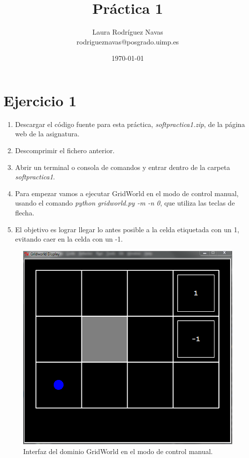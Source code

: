 \documentclass[11pt]{exam}
\title{Práctica 1}
\author{Laura Rodríguez Navas \\ rodrigueznavas@posgrado.uimp.es}
\date{{\selectlanguage{spanish}\today} }
\begin{document}
	
\maketitle

\section*{Ejercicio 1}

\begin{enumerate}
	\item Descargar el código fuente para esta práctica, \textit{softpractica1.zip}, de la página web de la asignatura.
	\item Descomprimir el fichero anterior.
	\item Abrir un terminal o consola de comandos y entrar dentro de la carpeta \textit{softpractica1}.
	\item Para empezar vamos a ejecutar GridWorld en el modo de control manual, usando el comando \textit{python gridworld.py -m -n 0}, que utiliza las teclas de flecha.	
	\item El objetivo es lograr llegar lo antes posible a la celda etiquetada con un 1, evitando caer en la celda con un -1.
\end{enumerate}

\begin{figure}[h]
	\centering
	\includegraphics[scale=0.5]{image_1}
	\caption{Interfaz del dominio GridWorld en el modo de control manual.}
	\label{image_1}
\end{figure}
\end{document}
